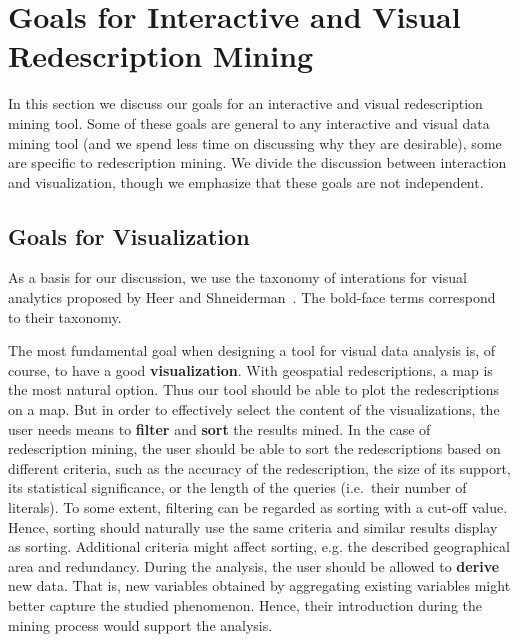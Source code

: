 
\section{Goals for Interactive and Visual Redescription Mining}
\label{sec:goals-inter-visu}

In this section we discuss our goals for an interactive and visual
redescription mining tool. Some of these goals are general to any
interactive and visual data mining tool (and we spend less time on
discussing why they are desirable), some are specific to
redescription mining. We divide the discussion between interaction and
visualization, though we emphasize that these goals are not independent.

\subsection{Goals for Visualization}
\label{sec:goals-visualization}
As a basis for our discussion, we use the taxonomy of interations for
visual analytics proposed by Heer and
Shneiderman~\cite{Heer:2012:IDV:2133806.2133821}. The bold-face terms
correspond to their taxonomy.

The most fundamental goal when designing a tool for visual data
analysis is, of course, to have a good \textbf{visualization}. With
geospatial redescriptions, a map is the most natural option. Thus our
tool should be able to plot the redescriptions on a map. But in order
to effectively select the content of the visualizations, the user
needs means to \textbf{filter} and \textbf{sort} the results mined. In
the case of redescription mining, the user should be able to sort the
redescriptions based on different criteria, such as the accuracy of
the redescription, the size of its support, its statistical
significance, or the length of the queries (i.e.\ their number of
literals).  To some extent, filtering can be regarded as sorting with
a cut-off value. Hence, sorting should naturally use the same criteria
and similar results display as sorting. Additional criteria might
affect sorting, e.g. the described geographical area and
redundancy. During the analysis, the user should be allowed to
\textbf{derive} new data. That is, new variables obtained by
aggregating existing variables might better capture the studied
phenomenon. Hence, their introduction during the mining process would
support the analysis.

